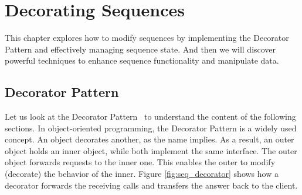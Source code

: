 \section{Decorating Sequences}
\label{sec:Decorating Sequences}
This chapter explores how to modify sequences by implementing the Decorator 
Pattern and effectively managing sequence state. And then we will discover 
powerful techniques to enhance sequence functionality and manipulate data.

\subsection{Decorator Pattern}
\label{sub:Decorator Pattern}
Let us look at the Decorator Pattern~\cite[p.~226]{gang_of_four_depa} to understand the content of the 
following sections. In object-oriented programming, the Decorator Pattern is a 
widely used concept. An object decorates another, as the name implies. As a 
result, an outer object holds an inner object, while both implement the same 
interface. The outer object forwards requests to the inner one. This enables
the outer to modify (decorate) the behavior of the inner. 
Figure \ref{fig:seq_decorator} shows how a decorator forwards the receiving calls and 
transfers the answer back to the client.

